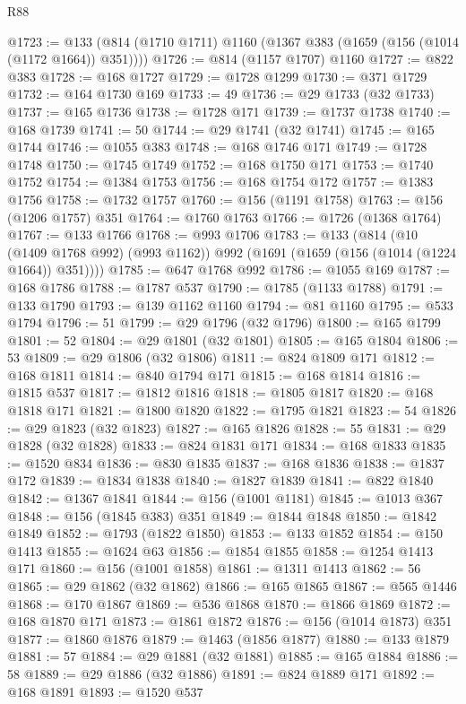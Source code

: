 \begin{lexlean}{R88}
\begin{coremodule}
@1723 := @133 (@814 (@1710 @1711) @1160 (@1367 @383 (@1659 (@156 (@1014 (@1172 @1664)) @351))))
@1726 := @814 (@1157 @1707) @1160
@1727 := @822 @383
@1728 := @168 @1727
@1729 := @1728 @1299
@1730 := @371 @1729
@1732 := @164 @1730 @169
@1733 := 49
@1736 := @29 @1733 (@32 @1733)
@1737 := @165 @1736
@1738 := @1728 @171
@1739 := @1737 @1738
@1740 := @168 @1739
@1741 := 50
@1744 := @29 @1741 (@32 @1741)
@1745 := @165 @1744
@1746 := @1055 @383
@1748 := @168 @1746 @171
@1749 := @1728 @1748
@1750 := @1745 @1749
@1752 := @168 @1750 @171
@1753 := @1740 @1752
@1754 := @1384 @1753
@1756 := @168 @1754 @172
@1757 := @1383 @1756
@1758 := @1732 @1757
@1760 := @156 (@1191 @1758)
@1763 := @156 (@1206 @1757) @351
@1764 := @1760 @1763
@1766 := @1726 (@1368 @1764)
@1767 := @133 @1766
@1768 := @993 @1706
@1783 := @133
    (@814
      (@10 (@1409 @1768 @992) (@993 @1162))
      @992
      (@1691 (@1659 (@156 (@1014 (@1224 @1664)) @351))))
@1785 := @647 @1768 @992
@1786 := @1055 @169
@1787 := @168 @1786
@1788 := @1787 @537
@1790 := @1785 (@1133 @1788)
@1791 := @133 @1790
@1793 := @139 @1162 @1160
@1794 := @81 @1160
@1795 := @533 @1794
@1796 := 51
@1799 := @29 @1796 (@32 @1796)
@1800 := @165 @1799
@1801 := 52
@1804 := @29 @1801 (@32 @1801)
@1805 := @165 @1804
@1806 := 53
@1809 := @29 @1806 (@32 @1806)
@1811 := @824 @1809 @171
@1812 := @168 @1811
@1814 := @840 @1794 @171
@1815 := @168 @1814
@1816 := @1815 @537
@1817 := @1812 @1816
@1818 := @1805 @1817
@1820 := @168 @1818 @171
@1821 := @1800 @1820
@1822 := @1795 @1821
@1823 := 54
@1826 := @29 @1823 (@32 @1823)
@1827 := @165 @1826
@1828 := 55
@1831 := @29 @1828 (@32 @1828)
@1833 := @824 @1831 @171
@1834 := @168 @1833
@1835 := @1520 @834
@1836 := @830 @1835
@1837 := @168 @1836
@1838 := @1837 @172
@1839 := @1834 @1838
@1840 := @1827 @1839
@1841 := @822 @1840
@1842 := @1367 @1841
@1844 := @156 (@1001 @1181)
@1845 := @1013 @367
@1848 := @156 (@1845 @383) @351
@1849 := @1844 @1848
@1850 := @1842 @1849
@1852 := @1793 (@1822 @1850)
@1853 := @133 @1852
@1854 := @150 @1413
@1855 := @1624 @63
@1856 := @1854 @1855
@1858 := @1254 @1413 @171
@1860 := @156 (@1001 @1858)
@1861 := @1311 @1413
@1862 := 56
@1865 := @29 @1862 (@32 @1862)
@1866 := @165 @1865
@1867 := @565 @1446
@1868 := @170 @1867
@1869 := @536 @1868
@1870 := @1866 @1869
@1872 := @168 @1870 @171
@1873 := @1861 @1872
@1876 := @156 (@1014 @1873) @351
@1877 := @1860 @1876
@1879 := @1463 (@1856 @1877)
@1880 := @133 @1879
@1881 := 57
@1884 := @29 @1881 (@32 @1881)
@1885 := @165 @1884
@1886 := 58
@1889 := @29 @1886 (@32 @1886)
@1891 := @824 @1889 @171
@1892 := @168 @1891
@1893 := @1520 @537

\end{coremodule}
\end{lexlean}
